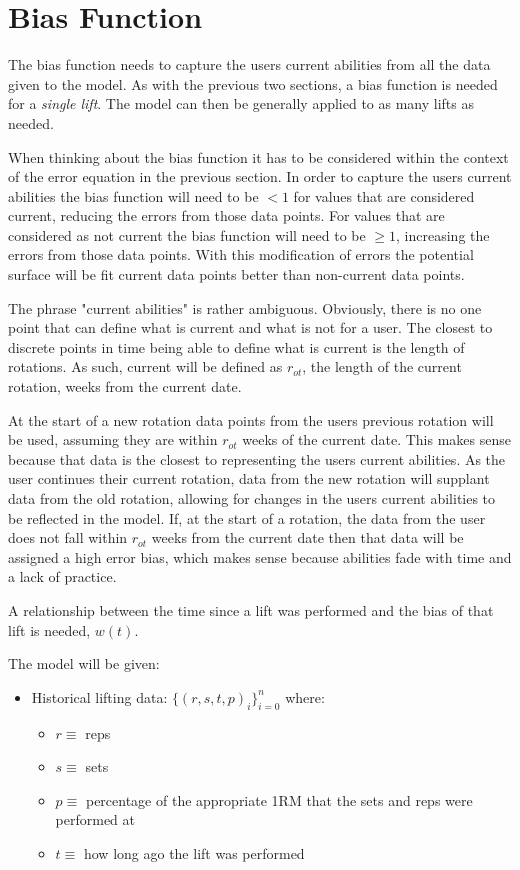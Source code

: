 \section{Bias Function}
The bias function needs to capture the users current abilities from all the data given to the model. As with the previous two sections, a bias function is needed for a \textit{single lift}. The model can then be generally applied to as many lifts as needed.

When thinking about the bias function it has to be considered within the context of the error equation in the previous section. In order to capture the users current abilities the bias function will need to be $< 1$ for values that are considered current, reducing the errors from those data points. For values that are considered as not current the bias function will need to be $\ge 1$, increasing the errors from those data points. With this modification of errors the potential surface will be fit current data points better than non-current data points.

The phrase "current abilities" is rather ambiguous. Obviously, there is no one point that can define what is current and what is not for a user. The closest to discrete points in time being able to define what is current is the length of rotations. As such, current will be defined as $r_{ot}$, the length of the current rotation, weeks from the current date.

At the start of a new rotation data points from the users previous rotation will be used, assuming they are within $r_{ot}$ weeks of the current date. This makes sense because that data is the closest to representing the users current abilities. As the user continues their current rotation, data from the new rotation will supplant data from the old rotation, allowing for changes in the users current abilities to be reflected in the model. If, at the start of a rotation, the data from the user does not fall within $r_{ot}$ weeks from the current date then that data will be assigned a high error bias, which makes sense because abilities fade with time and a lack of practice.

A relationship between the time since a lift was performed and the bias of that lift is needed, $w(t)$.

The model will be given:
\begin{itemize}
    \item Historical lifting data: $\{(r,s,t,p)_i\}_{i=0}^{n}$ where:
    \begin{itemize}
        \item $r\equiv$ reps
        \item $s\equiv$ sets
        \item $p\equiv$ percentage of the appropriate 1RM that the sets and reps were performed at
        \item $t\equiv$ how long ago the lift was performed
    \end{itemize}
\end{itemize}

